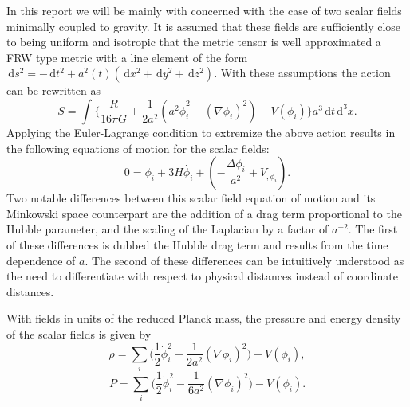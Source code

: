 \documentclass[letterpaper,11pt]{article}
\newcommand{\ud}{\,\mathrm{d}}
\begin{document}
In this report we will be mainly with concerned with the case of two scalar fields minimally coupled to gravity. It is assumed that these fields are sufficiently close to being uniform and isotropic that the metric tensor is well approximated a FRW type metric with a line element of the form $\ud s^2=-\ud t^2+a^2(t)(\ud x^2+\ud y^2+\ud z^2)$. With these assumptions the action can be rewritten as
\begin{equation}
S=\int \Big\{ \frac{R}{16 \pi G}+\frac{1}{2a^2}(a^2 \dot{\phi}^2_i - (\nabla{\phi_i})^2) - V(\phi_i) \Big\}a^3\ud t\ud^3x.
\end{equation}
Applying the Euler-Lagrange condition to extremize the above action results in the following equations of motion for the scalar fields:
\begin{equation}
0=\ddot{\phi_i}+3H\dot{\phi_i}+(-\frac{\Delta \phi_i}{a^2}+V_{,\phi_i}). \label{eom phi}
\end{equation}
Two notable differences between this scalar field equation of motion and its Minkowski space counterpart are the addition of a drag term proportional to the Hubble parameter, and the scaling of the Laplacian by a factor of $a^{-2}$. The first of these differences is dubbed the Hubble drag term and results from the time dependence of $a$. The second of these differences can be intuitively understood as the need to differentiate with respect to physical distances instead of coordinate distances.

With fields in units of the reduced Planck mass, the pressure and energy density of the scalar fields is given by
\begin{equation}
\rho = \sum_i \Big(\frac{1}{2}\dot{\phi}_i^2 + \frac{1}{2a^2}(\nabla\phi_i)^2\Big) + V(\phi_i), \label{rho eqn}
\end{equation}
\begin{equation}
P = \sum_i \Big(\frac{1}{2}\dot{\phi}_i^2 - \frac{1}{6a^2}(\nabla\phi_i)^2\Big) - V(\phi_i). \label{p eqn}
\end{equation}
\end{document}

